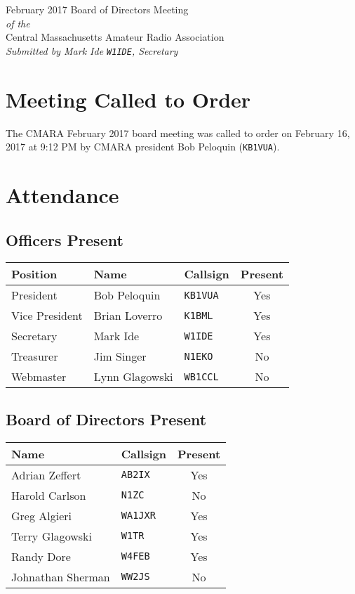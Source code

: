 \documentclass[10pt,letterpaper]{article}
\begin{document}
\begin{center}
{\huge February 2017 Board of Directors Meeting}\\
\emph{of the}\\
{\Large Central Massachusetts Amateur Radio Association}\\
\emph{Submitted by Mark Ide \texttt{W1IDE}, Secretary}
\end{center}

\section{Meeting Called to Order}
The CMARA February 2017 board meeting was called to order on February 16, 2017 at 9:12 PM by CMARA president Bob Peloquin (\texttt{KB1VUA}).

\section{Attendance}

\subsection{Officers Present}
\begin{tabular}{|l|l|l|c|}
  \hline
  \textbf{Position} & \textbf{Name}  & \textbf{Callsign} & \textbf{Present} \\ \hline
  President         & Bob Peloquin   & \texttt{KB1VUA}   & Yes \\
  Vice President    & Brian Loverro  & \texttt{K1BML}    & Yes \\
  Secretary         & Mark Ide       & \texttt{W1IDE}    & Yes \\
  Treasurer         & Jim Singer     & \texttt{N1EKO}    & No  \\
  Webmaster         & Lynn Glagowski & \texttt{WB1CCL}   & No  \\
  \hline
\end{tabular}

\subsection{Board of Directors Present}
\begin{tabular}{|l|l|c|}
  \hline
  \textbf{Name}     & \textbf{Callsign} & \textbf{Present} \\ \hline
  Adrian Zeffert    & \texttt{AB2IX}    & Yes \\
  Harold Carlson    & \texttt{N1ZC}     & No  \\
  Greg Algieri      & \texttt{WA1JXR}   & Yes \\
  Terry Glagowski   & \texttt{W1TR}     & Yes \\
  Randy Dore        & \texttt{W4FEB}    & Yes \\
  Johnathan Sherman & \texttt{WW2JS}    & No  \\
  \hline
\end{tabular}
\end{document}
